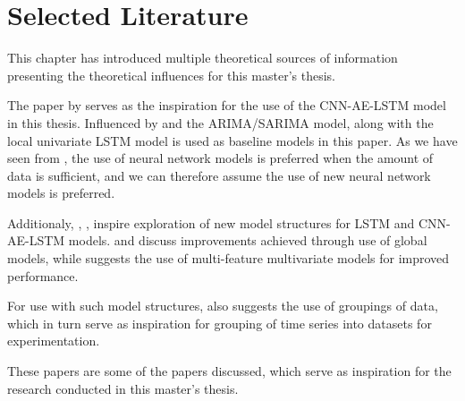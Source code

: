 
\section{Selected Literature}
\label{section:RelatedWork:SelectedLiterature}

This chapter has introduced multiple theoretical sources of information
presenting the theoretical influences for this master's thesis.

The paper by \cite{Zhao2019} serves as the inspiration for the use of the CNN-AE-LSTM model
in this thesis.
Influenced by \cite{Zhao2019} and \cite{Cerqueira2019} the ARIMA/SARIMA model, along with the local univariate LSTM model
is used as baseline models in this paper.
As we have seen from \cite{Cerqueira2019}, the use of neural network models is preferred when the amount of data is sufficient,
and we can therefore assume the use of new neural network models is preferred.

Additionaly, \cite{Montero-Manso2021}, \cite{Bandara2017}, \cite{Laptev} inspire exploration of new model structures for
LSTM and CNN-AE-LSTM models.
\cite{Montero-Manso2021} and \cite{Bandara2017} discuss improvements achieved through use of global models,
while \cite{Laptev} suggests the use of multi-feature multivariate models for improved performance.

For use with such model structures, \cite{Bandara2017} also suggests the use of groupings of data,
which in turn serve as inspiration for grouping of time series into datasets for experimentation.

These papers are some of the papers discussed, which serve as inspiration for the research conducted in this master's thesis.




















